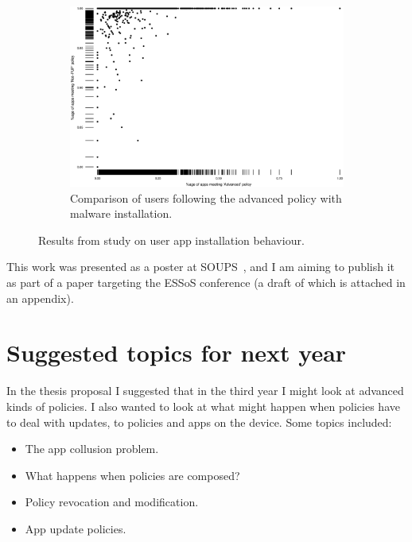 \documentclass[a4paper]{scrartcl}
\begin{document}
\begin{figure}
  \begin{subfigure}[b]{\linewidth}
    \includegraphics[width=\linewidth]{./images/compare-2yr.eps}
    \caption{Comparison of users following the advanced policy with malware installation.}
    \label{sfig:compare}
  \end{subfigure}

  \caption{Results from study on user app installation behaviour.}
  \label{fig:lin}
\end{figure}

This work was presented as a poster at SOUPS~\citep{Hallett:2015ty}, and I am aiming to publish it as part of a paper targeting the ESSoS conference (a draft of which is attached in an appendix).

\section{Suggested topics for next year}
\label{sec:futurework}

In the thesis proposal I suggested that in the third year I might look at advanced kinds of policies.
I also wanted to look at what might happen when policies have to deal with updates, to policies and apps on the device.
Some topics included:
\begin{itemize}
  \item The app collusion problem.
  \item What happens when policies are composed?
  \item Policy revocation and modification.
  \item App update policies.
\end{itemize}
\end{document}

